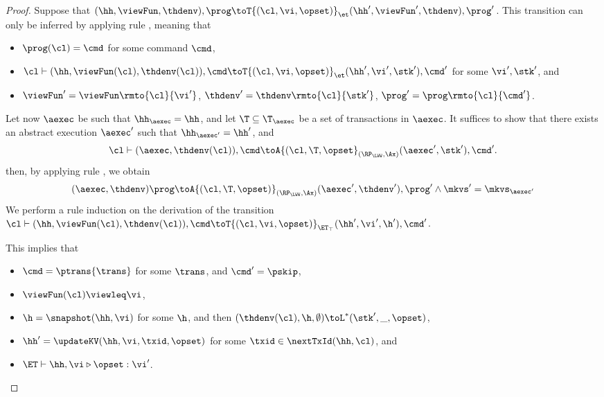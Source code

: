 \begin{proof}
Suppose that $(\hh, \viewFun, \thdenv), \prog \toT{(\cl, \vi, \opset)}_{\et} (\hh', \viewFun', \thdenv), \prog'$. 
This transition can only be inferred by applying rule , meaning that 
\begin{itemize}
\item $\prog(\cl) = \cmd$ for some command $\cmd$, 
\item $\cl \vdash (\hh, \viewFun(\cl), \thdenv(\cl)), \cmd \toT{(\cl, \vi, \opset)}_{\et} (\hh', \vi', \stk'), \cmd'$ 
for some $\vi', \stk'$, and 
\item $\viewFun' = \viewFun\rmto{\cl}{\vi'}$, $\thdenv' = \thdenv\rmto{\cl}{\stk'}$, $\prog' = \prog\rmto{\cl}{\cmd'}$. 
\end{itemize}
Let now $\aexec$ be such that $\hh_{\aexec} = \hh$, and let $\T \subseteq \T_{\aexec}$ be a set of 
transactions in $\aexec$. 
It suffices to show that there exists an abstract execution $\aexec'$ such that 
$\hh_{\aexec'} = \hh'$, and 
\[
\cl \vdash (\aexec, \thdenv(\cl)), \cmd \toA{(\cl, \T , \opset}_{(\RP_{\LWW}, \Ax)} (\aexec', \stk'), \cmd'.
\]
then, by applying rule , we obtain 
\[ 
    (\aexec, \thdenv) \prog \toA{(\cl, \T, \opset)}_{(\RP_{\LWW}, \Ax)} (\aexec' ,\thdenv'), \prog' \land \mkvs' = \mkvs_{\aexec'}
\]
We perform a rule induction on the derivation of the transition $\cl \vdash (\hh, \viewFun(\cl), \thdenv(\cl)), \cmd \toT{(\cl, \vi, \opset)}_{\ET_{\top}} (\hh', \vi', \h'), \cmd'$. 

This implies that 
\begin{itemize}
\item $\cmd = \ptrans{\trans}$ for some $\trans$, and $\cmd' = \pskip$,
\item $\viewFun(\cl) \viewleq \vi$, 
\item $\h = \snapshot(\hh, \vi)$ for some \( \h \), and then $(\thdenv(\cl), \h, \emptyset) \toL^{\ast} (\stk', \_, \opset)$, 
\item $\hh' = \updateKV(\hh, \vi, \txid, \opset)$ for some $\txid \in \nextTxId(\hh, \cl)$, and
\item $\ET \vdash \hh, \vi \triangleright \opset: \vi'$.
\end{itemize}


\end{proof}
